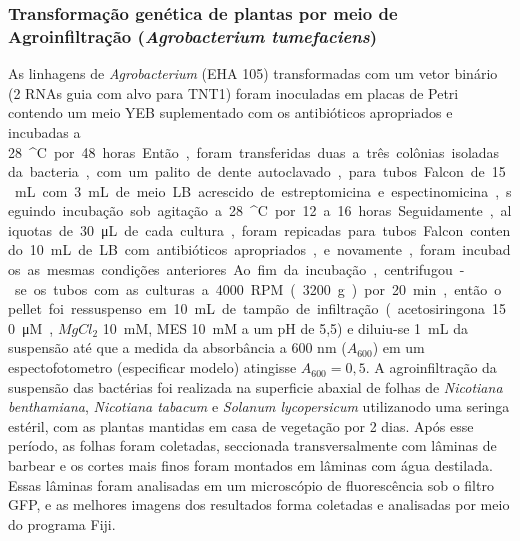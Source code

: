 \subsubsection{Transformação genética de plantas por meio de Agroinfiltração (\textit{Agrobacterium tumefaciens})}
As linhagens de \textit{Agrobacterium} (EHA 105) transformadas com um vetor binário (2 RNAs guia com alvo para TNT1) foram inoculadas em placas de Petri contendo um meio YEB suplementado com os antibióticos apropriados e incubadas a \qty{28}{^\circ C} por 48 horas. Então, foram transferidas duas a três colônias isoladas da bacteria, com um palito de dente autoclavado, para tubos Falcon de \qty{15}{mL} com \qty{3}{mL} de meio LB acrescido de estreptomicina e espectinomicina, seguindo incubação sob agitação a \qty{28}{^\circ C} por 12 a 16 horas. Seguidamente, aliquotas de \qty{30}{\micro L} de cada cultura, foram repicadas para tubos Falcon contendo \qty{10}{mL} de LB com antibióticos apropriados, e novamente, foram incubados as mesmas condições anteriores. Ao fim da incubação, centrifugou-se os tubos com as culturas a \qty{4000}{RPM} (\qty{3200}{g}) por \qty{20}{min}, então o pellet foi ressuspenso em \qty{10}{mL} de tampão de infiltração (acetosiringona \qty{150}{\micro M}, $MgCl_2$ \qty{10}{mM}, MES \qty{10}{mM} a um pH de 5,5) e diluiu-se \qty{1}{mL} da suspensão até que a medida da absorbância a 600 nm ($A_600$) em um espectofotometro (especificar modelo)  atingisse $A_600 = 0,5$.
A agroinfiltração da suspensão das bactérias foi realizada na superficie abaxial de folhas de \textit{Nicotiana benthamiana}, \textit{Nicotiana tabacum} e \textit{Solanum lycopersicum} utilizanodo uma seringa estéril, com as plantas mantidas em casa de vegetação por 2 dias. Após esse período, as folhas foram coletadas, seccionada transversalmente com lâminas de barbear e os cortes mais finos foram montados em lâminas com água destilada. Essas lâminas foram analisadas em um microscópio de fluorescência sob o filtro GFP, e as melhores imagens dos resultados forma coletadas e analisadas por meio do programa Fiji.  
